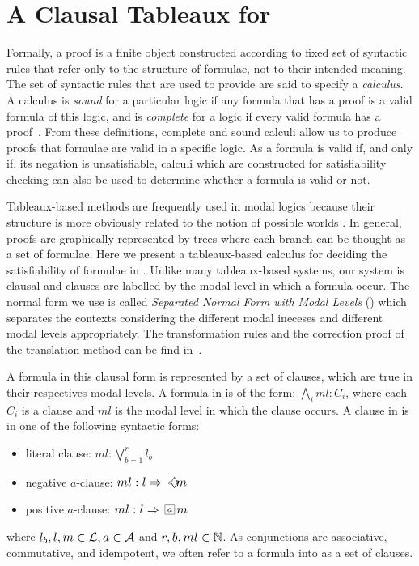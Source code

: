 \section{A Clausal Tableaux for }
\label{sec:tableauxclausal}

Formally, a proof is a finite object constructed according to fixed set of syntactic rules that refer only to the structure of formulae, not to their intended
meaning. The set of syntactic rules that are used to provide are said to specify a \emph{calculus}. A calculus is \emph{sound} for a particular logic if any
formula that has a proof is a valid formula of this logic, and is
\emph{complete} for a logic if every valid formula has a proof~\cite{fitting}.
From these definitions, complete and sound calculi allow us to produce proofs that formulae are valid in a specific logic. As a formula is valid if, and only if, its negation is unsatisfiable, calculi which are constructed for satisfiability checking can also be used to determine whether a formula is valid or not.

Tableaux-based methods are frequently used in modal
logics because their structure is more obviously related to the notion of
possible worlds \cite{fitting}. In general, proofs are graphically represented by trees where each branch can be thought as a set of formulae. Here we present a tableaux-based calculus for deciding the satisfiability of formulae in . Unlike many tableaux-based systems, our system is clausal and clauses are labelled by the modal level in which a formula occur. The normal form we use is called \emph{Separated Normal Form with Modal Levels} () which separates the contexts considering the different modal ineceses and different modal levels appropriately. The transformation rules and the correction proof of the translation method can be find in~\cite{nalon2015modal}.

A formula in this clausal form is represented by a set of clauses, which are
true in their respectives modal levels. A formula in  is of the form:
$\bigwedge_i ml : C_i$,
where each $C_i$ is a clause and $ml$ is the modal level in which the clause
occurs. A clause in  is in one of the following syntactic forms:
\begin{itemize}
    \item literal clause:
        $
        ml: \bigvee^r_{b=1} l_b
        $
    \item negative $a$-clause:
        $
        ml: l \then \pos{a}m
        $
    \item positive $a$-clause:
        $
        ml: l \then \nec{a}m
        $
\end{itemize}
where $l_b, l, m \in \Literals, a \in \Agents$ and $r,b,ml \in \Nat$. As conjunctions are associative, commutative, and idempotent, we often refer to a formula into  as a set of clauses.

